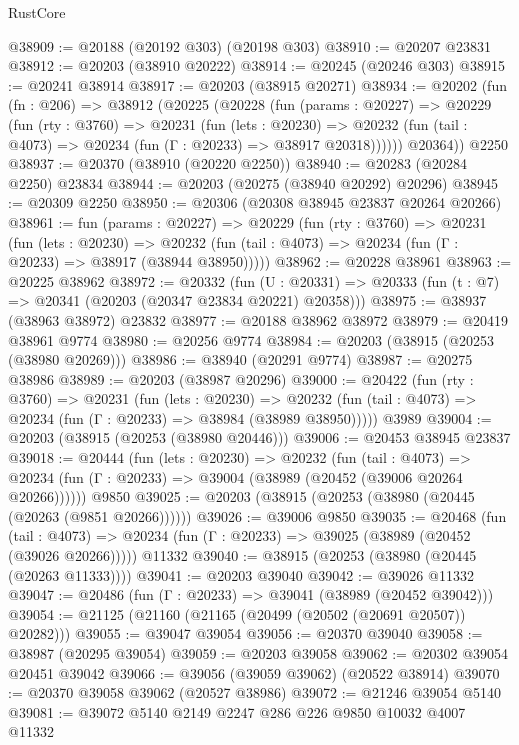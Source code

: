 \begin{lexlean}{RustCore}
\begin{coremodule}
@38909 := @20188 (@20192 @303) (@20198 @303)
@38910 := @20207 @23831
@38912 := @20203 (@38910 @20222)
@38914 := @20245 (@20246 @303)
@38915 := @20241 @38914
@38917 := @20203 (@38915 @20271)
@38934 := @20202
    (fun (fn : @206) =>
    @38912
      (@20225
        (@20228
          (fun (params : @20227) =>
          @20229
            (fun (rty : @3760) =>
            @20231
              (fun (lets : @20230) =>
              @20232 (fun (tail : @4073) => @20234 (fun (Γ : @20233) => @38917 @20318))))))
        @20364))
    @2250
@38937 := @20370 (@38910 (@20220 @2250))
@38940 := @20283 (@20284 @2250) @23834
@38944 := @20203 (@20275 (@38940 @20292) @20296)
@38945 := @20309 @2250
@38950 := @20306 (@20308 @38945 @23837 @20264 @20266)
@38961 := fun (params : @20227) =>
  @20229
    (fun (rty : @3760) =>
    @20231
      (fun (lets : @20230) =>
      @20232 (fun (tail : @4073) => @20234 (fun (Γ : @20233) => @38917 (@38944 @38950)))))
@38962 := @20228 @38961
@38963 := @20225 @38962
@38972 := @20332
    (fun (U : @20331) => @20333 (fun (t : @7) => @20341 (@20203 (@20347 @23834 @20221) @20358)))
@38975 := @38937 (@38963 @38972) @23832
@38977 := @20188 @38962 @38972
@38979 := @20419 @38961 @9774
@38980 := @20256 @9774
@38984 := @20203 (@38915 (@20253 (@38980 @20269)))
@38986 := @38940 (@20291 @9774)
@38987 := @20275 @38986
@38989 := @20203 (@38987 @20296)
@39000 := @20422
    (fun (rty : @3760) =>
    @20231
      (fun (lets : @20230) =>
      @20232 (fun (tail : @4073) => @20234 (fun (Γ : @20233) => @38984 (@38989 @38950)))))
    @3989
@39004 := @20203 (@38915 (@20253 (@38980 @20446)))
@39006 := @20453 @38945 @23837
@39018 := @20444
    (fun (lets : @20230) =>
    @20232
      (fun (tail : @4073) =>
      @20234 (fun (Γ : @20233) => @39004 (@38989 (@20452 (@39006 @20264 @20266))))))
    @9850
@39025 := @20203 (@38915 (@20253 (@38980 (@20445 (@20263 (@9851 @20266))))))
@39026 := @39006 @9850
@39035 := @20468
    (fun (tail : @4073) => @20234 (fun (Γ : @20233) => @39025 (@38989 (@20452 (@39026 @20266)))))
    @11332
@39040 := @38915 (@20253 (@38980 (@20445 (@20263 @11333))))
@39041 := @20203 @39040
@39042 := @39026 @11332
@39047 := @20486 (fun (Γ : @20233) => @39041 (@38989 (@20452 @39042)))
@39054 := @21125 (@21160 (@21165 (@20499 (@20502 (@20691 @20507)) @20282)))
@39055 := @39047 @39054
@39056 := @20370 @39040
@39058 := @38987 (@20295 @39054)
@39059 := @20203 @39058
@39062 := @20302 @39054 @20451 @39042
@39066 := @39056 (@39059 @39062) (@20522 @38914)
@39070 := @20370 @39058 @39062 (@20527 @38986)
@39072 := @21246 @39054 @5140
@39081 := @39072 @5140 @2149 @2247 @286 @226 @9850 @10032 @4007 @11332

\end{coremodule}
\end{lexlean}
